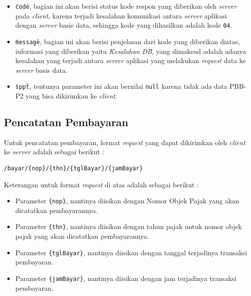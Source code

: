 \documentclass[pdftex,12pt, oneside]{article}
\begin{document}
  \begin{itemize}
    \item \texttt{\"code\"}, bagian ini akan berisi status kode respon yang diberikan oleh \textit{server} pada \textit{client}, karena terjadi kesalahan komunikasi antara \textit{server} aplikasi dengan \textit{server} basis data, sehingga kode yang dihasilkan adalah kode \texttt{04}.
    
    \item \texttt{\"message\"}, bagian ini akan berisi penjelasan dari kode yang diberikan diatas, informasi yang diberikan yaitu \textit{\"Kesalahan DB\"}, yang dimaksud adalah adanya kesalahan yang terjadi antara \textit{server} aplikasi yang melakukan \textit{request} data ke \textit{server} basis data.
    
    \item \texttt{\"sppt\"}, tentunya parameter ini akan bernilai \texttt{null} karena tidak ada data PBB-P2 yang bisa dikirimkan ke \textit{client}.
  \end{itemize}

\subsection{Pencatatan Pembayaran}

  Untuk pencatatan pembayaran, format \textit{request} yang dapat dikirimkan oleh \textit{client} ke \textit{server} adalah sebagai berikut :
  
  \begin{lstlisting}
/bayar/{nop}/{thn}/{tglBayar}/{jamBayar}
  \end{lstlisting}
  
  Keterangan untuk format \textit{request} di atas adalah sebagai berikut :
  
  \begin{itemize}
    \item Parameter \texttt{\{nop\}}, nantinya diisikan dengan Nomor Objek Pajak yang akan dicatatkan pembayarannya.
    
    \item Parameter \texttt{\{thn\}}, nantinya diisikan dengan tahun pajak untuk nomor objek pajak yang akan dicatatkan pembayarannya.
    
    \item Parameter \texttt{\{tglBayar\}}, nantinya diisikan dengan tanggal terjadinya transaksi pembayaran.
    
    \item Parameter \texttt{\{jamBayar\}}, nantinya diisikan dengan jam terjadinya transaksi pembayaran.
  \end{itemize}
  
\end{document}
